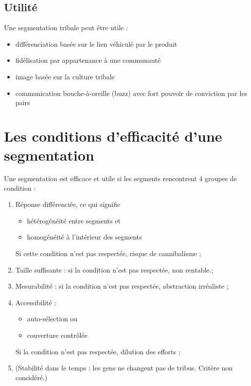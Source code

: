 	
		\subsection{Utilité}
		
		Une segmentation tribale peut être utile :
		
		\begin{itemize}	
			\item différenciation basée sur le lien véhiculé par le produit
			\item fidélisation par appartenance à une communauté
			\item image basée sur la culture tribale
			\item communication bouche-à-oreille (buzz) avec fort pouvoir de conviction par les pairs
		\end{itemize}
	
	\section{Les conditions d'efficacité d'une segmentation}
	
	Une segmentation est efficace et utile si les segments rencontrent 4 groupes de condition :
	
	\begin{enumerate}
		\item Réponse différenciée, ce qui signifie
		\begin{itemize}
			\item hétérogénéité entre segments et
			\item homogénéité à l'intérieur des segments
		\end{itemize}
		
		Si cette condition n'est pas respectée, risque de cannibalisme ;
		
		
		\item Taille suffisante : si la condition n'est pas respectée, non rentable.;
		\item Mesurabilité : si la condition n'est pas respectée, abstraction irréaliste ;
		\item Accessibilité :
		\begin{itemize}
			\item auto-sélection ou
			\item couverture contrôlée
		\end{itemize}
		
		Si la condition n'est pas respectée, dilution des efforts ;
		
		\item (Stabilité dans le temps : les gens ne changent pas de tribus. Critère non considéré.)
	\end{enumerate}
	

	
		